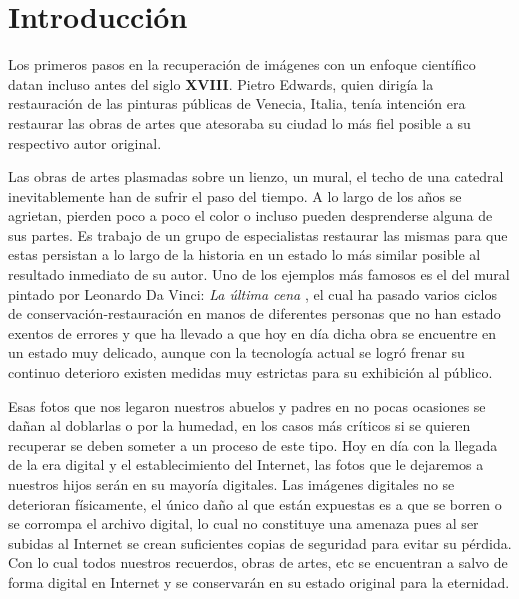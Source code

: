 \chapter*{Introducción}\label{chapter:introduction}

\qquad

Los primeros pasos en la recuperaci\'on de imágenes con un enfoque científico datan incluso antes del siglo \textbf{XVIII}. Pietro Edwards\cite{itwiki:PE}, quien dirigía la restauraci\'on de las pinturas p\'ublicas de Venecia, Italia, ten\'ia intenci\'on era restaurar las obras de artes que atesoraba su ciudad lo m\'as fiel posible a su respectivo autor original.

Las obras de artes plasmadas sobre un lienzo, un mural, el techo de una catedral inevitablemente han de sufrir el paso del tiempo. A lo largo de los años se agrietan, pierden poco a poco el color o incluso pueden desprenderse alguna de sus partes. Es trabajo de un grupo de especialistas restaurar las mismas para que estas persistan a lo largo de la historia en un estado lo m\'as similar posible al resultado inmediato de su autor. Uno de los ejemplos m\'as famosos es el del mural pintado por Leonardo Da Vinci: \textit{La \'ultima cena} \cite{wiki:CR-TLS}, el cual ha pasado varios ciclos de conservaci\'on-restauraci\'on en manos de diferentes personas que no han estado exentos de errores y que ha llevado a que hoy en d\'ia dicha obra se encuentre en un estado muy delicado, aunque con la tecnología actual se logr\'o frenar su continuo deterioro existen medidas muy estrictas para su exhibición al p\'ublico.

Esas fotos que nos legaron nuestros abuelos y padres en no pocas ocasiones se dañan al doblarlas o por la humedad, en los casos m\'as cr\'iticos si se quieren recuperar se deben someter a un proceso de este tipo. Hoy en d\'ia con la llegada de la era digital y el establecimiento del Internet, las fotos que le dejaremos a nuestros hijos ser\'an en su mayor\'ia digitales. Las im\'agenes digitales no se deterioran físicamente, el \'unico daño al que est\'an expuestas es a que se borren o se corrompa el archivo digital, lo cual no constituye una amenaza pues al ser subidas al Internet se crean suficientes copias de seguridad para evitar su p\'erdida. Con lo cual todos nuestros recuerdos, obras de artes, etc se encuentran a salvo de forma digital en Internet y se conservar\'an en su estado original para la eternidad.

